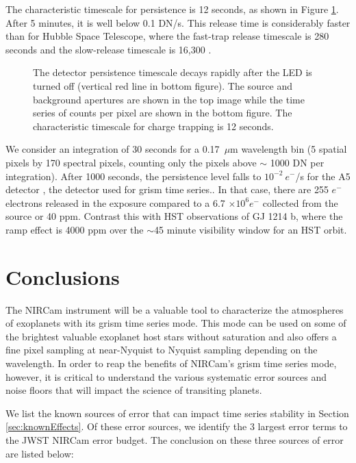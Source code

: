 \documentclass[]{aastex62}
\begin{document}
The characteristic timescale for persistence is 12 seconds, as shown in Figure \ref{fig:persistence}.
After 5 minutes, it is well below 0.1 DN/s.
This release time is considerably faster than for Hubble Space Telescope, where the fast-trap release timescale is 280 seconds and the slow-release timescale is 16,300 \citep{zhou2017chargeTrap}.

\begin{figure}
{}
{}
\caption{The detector persistence timescale decays rapidly after the LED is turned off (vertical red line in bottom figure).
The source and background apertures are shown in the top image while the time series of counts per pixel are shown in the bottom figure.
The characteristic timescale for charge trapping is 12 seconds.}\label{fig:persistence}
\end{figure}

We consider an  integration of 30 seconds for a 0.17~$\mu$m wavelength bin (5 spatial pixels by 170 spectral pixels, counting only the pixels above $\sim$ 1000 DN per integration).
After 1000 seconds, the persistence level falls to $10^{-2}~e^-$/s for the A5 detector \citep{leisenring2016persistence}, the detector used for grism time series..
In that case, there are 255 $e^-$ electrons released in the exposure compared to a 6.7 $\times 10^6 e^-$ collected from the source or 40 ppm.
Contrast this with HST observations of GJ 1214 b, where the ramp effect is 4000 ppm \citep{berta2012flat_gj1214} over the $\sim$45 minute visibility window for an HST orbit.

\section{Conclusions}\label{sec:Conclusion}
The NIRCam instrument will be a valuable tool to characterize the atmospheres of exoplanets with its grism time series mode.
This mode can be used on some of the brightest valuable exoplanet host stars without saturation and also offers a fine pixel sampling at near-Nyquist to Nyquist sampling depending on the wavelength.
In order to reap the benefits of NIRCam's grism time series mode, however, it is critical to understand the various systematic error sources and noise floors that will impact the science of transiting planets.

We list the known sources of error that can impact time series stability in Section \ref{sec:knownEffects}.
Of these error sources, we identify the 3 largest error terms to the JWST NIRCam error budget.
The conclusion on these three sources of error are listed below:
\end{document}
